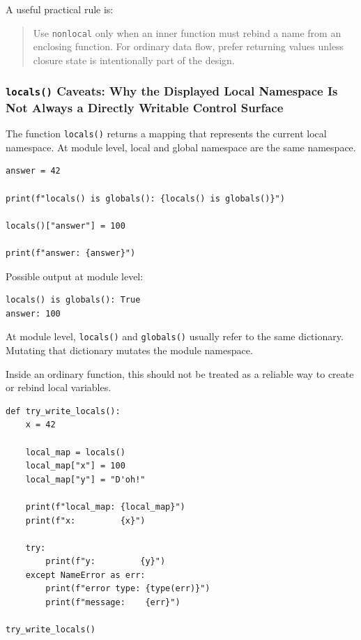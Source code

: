 A useful practical rule is:

\begin{quote}
Use \texttt{nonlocal} only when an inner function must rebind a name from an enclosing function. For ordinary data flow, prefer returning values unless closure state is intentionally part of the design.
\end{quote}

\subsubsection{\texttt{locals()} Caveats: Why the Displayed Local Namespace Is Not Always a Directly Writable Control Surface}

The function \texttt{locals()} returns a mapping that represents the current local namespace. At module level, local and global namespace are the same namespace.

\begin{verbatim}
answer = 42

print(f"locals() is globals(): {locals() is globals()}")

locals()["answer"] = 100

print(f"answer: {answer}")
\end{verbatim}

Possible output at module level:

\begin{verbatim}
locals() is globals(): True
answer: 100
\end{verbatim}

At module level, \texttt{locals()} and \texttt{globals()} usually refer to the same dictionary. Mutating that dictionary mutates the module namespace.

Inside an ordinary function, this should not be treated as a reliable way to create or rebind local variables.

\begin{verbatim}
def try_write_locals():
    x = 42

    local_map = locals()
    local_map["x"] = 100
    local_map["y"] = "D'oh!"

    print(f"local_map: {local_map}")
    print(f"x:         {x}")

    try:
        print(f"y:         {y}")
    except NameError as err:
        print(f"error type: {type(err)}")
        print(f"message:    {err}")

try_write_locals()
\end{verbatim}


